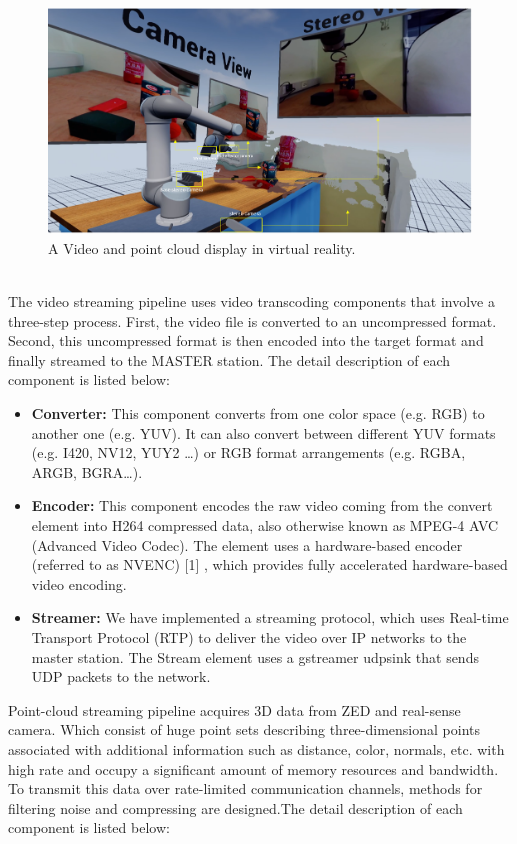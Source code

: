 \begin{figure}[h]
    \centering
    \includegraphics[scale=0.3]{images/Point_cloud_multipl_1.PNG}
    \caption{A Video and point cloud display in virtual reality.}
    \label{fig:StreamingPipe}
\end{figure}\\


The video streaming pipeline uses video transcoding components that involve a three-step process. First, the video file is converted to an uncompressed format. Second, this uncompressed format is then encoded into the target format and finally streamed to the MASTER station. The detail description of each component is listed below:
\begin{itemize}
    \item \textbf{Converter:} This component converts from one color space (e.g. RGB) to another one (e.g. YUV). It can also convert between different YUV formats (e.g. I420, NV12, YUY2 …) or RGB format arrangements (e.g. RGBA, ARGB, BGRA…).
    \item \textbf{Encoder:} This component encodes the raw video coming from the convert element into H264 compressed data, also otherwise known as MPEG-4 AVC (Advanced Video Codec). The element uses a hardware-based encoder (referred to as NVENC) [1] , which provides fully accelerated hardware-based video encoding.
    \item \textbf{Streamer:} We have implemented a streaming protocol, which uses Real-time Transport Protocol (RTP) to deliver the video over IP networks to the master station. The Stream element uses a gstreamer udpsink that sends UDP packets to the network.  

\end{itemize}


Point-cloud streaming pipeline acquires 3D data from ZED and real-sense camera. Which consist of huge point sets describing three-dimensional points associated with additional information such as distance, color, normals, etc. with high rate and occupy a significant amount of memory resources and bandwidth. To transmit this data over rate-limited communication channels, methods for filtering noise and compressing are designed.The detail description of each component is listed below: 

